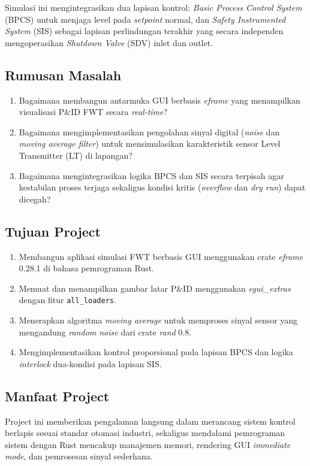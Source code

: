\documentclass[12pt,a4paper]{article}
\begin{document}
Simulasi ini mengintegrasikan dua lapisan kontrol:
\textit{Basic Process Control System} (BPCS) untuk menjaga level pada
\textit{setpoint} normal, dan \textit{Safety Instrumented System} (SIS)
sebagai lapisan perlindungan terakhir yang secara independen mengoperasikan
\textit{Shutdown Valve} (SDV) inlet dan outlet.

\subsection{Rumusan Masalah}
\begin{enumerate}
    \item Bagaimana membangun antarmuka GUI berbasis \textit{eframe} yang
          menampilkan visualisasi P\&ID FWT secara \textit{real-time}?
    \item Bagaimana mengimplementasikan pengolahan sinyal digital
          (\textit{noise} dan \textit{moving average filter}) untuk
          mensimulasikan karakteristik sensor Level Transmitter (LT)
          di lapangan?
    \item Bagaimana mengintegrasikan logika BPCS dan SIS secara terpisah
          agar kestabilan proses terjaga sekaligus kondisi kritis
          (\textit{overflow} dan \textit{dry run}) dapat dicegah?
\end{enumerate}

\subsection{Tujuan Project}
\begin{enumerate}
    \item Membangun aplikasi simulasi FWT berbasis GUI menggunakan crate
          \textit{eframe} 0.28.1 di bahasa pemrograman Rust.
    \item Memuat dan menampilkan gambar latar P\&ID menggunakan
          \textit{egui\_extras} dengan fitur \texttt{all\_loaders}.
    \item Menerapkan algoritma \textit{moving average} untuk memproses
          sinyal sensor yang mengandung \textit{random noise} dari crate
          \textit{rand} 0.8.
    \item Mengimplementasikan kontrol proporsional pada lapisan BPCS dan
          logika \textit{interlock} dua-kondisi pada lapisan SIS.
\end{enumerate}

\subsection{Manfaat Project}
Project ini memberikan pengalaman langsung dalam merancang sistem kontrol
berlapis sesuai standar otomasi industri, sekaligus mendalami pemrograman
sistem dengan Rust mencakup manajemen memori, rendering GUI \textit{immediate
mode}, dan pemrosesan sinyal sederhana.
\end{document}
